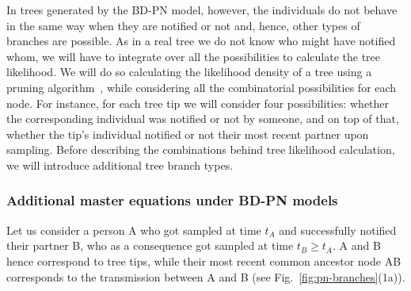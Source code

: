\documentclass[a4paper,10pt]{article}
\begin{document}
In trees generated by the BD-PN model, however, the individuals do not behave in the same way when they are notified or not and, hence, other types of branches are possible. As in a real tree we do not know who might have notified whom, we will have to integrate over all the possibilities to calculate the tree likelihood. We will do so calculating the likelihood density of a tree using a pruning algorithm~\citep{10.1093/sysbio/22.3.240}, while considering all the combinatorial possibilities for each node. For instance, for each tree tip we will consider four possibilities: whether the corresponding individual was notified or not by someone, and on top of that, whether the tip's individual notified or not their most recent partner upon sampling. Before describing the combinations behind tree likelihood calculation, we will introduce additional tree branch types.

\subsubsection{Additional master equations under BD-PN models}

Let us consider a person A who got sampled at time $t_A$ and successfully notified their partner B, who as a consequence got sampled at time $t_B \geq t_A$. A and B hence correspond to tree tips, while their most recent common ancestor node AB corresponds to the transmission between A and B (see Fig.~\ref{fig:pn-branches}(1a)).
\end{document}
